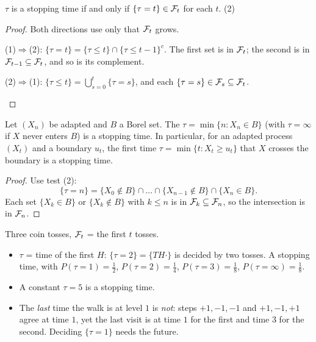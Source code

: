 \begin{result}
\label{res:st-equiv}
$\tau$ is a stopping time if and only if $\{\tau=t\}\in\mathcal F_t$ for each $t$. \hfill (2)
\end{result}
\begin{proof}
Both directions use only that $\mathcal F_t$ grows.
\begin{steps}
  \item (1)$\Rightarrow$(2): $\{\tau=t\}=\{\tau\le t\}\cap\{\tau\le t-1\}^c$. The first set is in $\mathcal F_t$; the second is in $\mathcal F_{t-1}\subseteq\mathcal F_t$, and so is its complement.
  \item (2)$\Rightarrow$(1): $\{\tau\le t\}=\bigcup_{s=0}^t\{\tau=s\}$, and each $\{\tau=s\}\in\mathcal F_s\subseteq\mathcal F_t$. \qedhere
\end{steps}
\end{proof}

\begin{result}
\label{res:entry}
Let $(X_n)$ be adapted and $B$ a Borel set. The  $\tau=\min\{n:X_n\in B\}$ (with $\tau=\infty$ if $X$ never enters $B$) is a stopping time. In particular, for an adapted process $(X_t)$ and a boundary $u_t$, the first time $\tau=\min\{t:X_t\ge u_t\}$ that $X$ crosses the boundary is a stopping time.
\end{result}
\begin{proof}
Use test (2):
\[
  \{\tau=n\}=\{X_0\notin B\}\cap\dots\cap\{X_{n-1}\notin B\}\cap\{X_n\in B\}.
\]
Each set $\{X_k\in B\}$ or $\{X_k\notin B\}$ with $k\le n$ is in $\mathcal F_k\subseteq\mathcal F_n$, so the intersection is in $\mathcal F_n$.
\end{proof}

\begin{example}
Three coin tosses, $\mathcal F_t$ = the first $t$ tosses.
\begin{itemize}
  \item $\tau$ = time of the first $H$: $\{\tau=2\}=\{TH\cdot\}$ is decided by two tosses. A stopping time, with $P(\tau=1)=\frac12$, $P(\tau=2)=\frac14$, $P(\tau=3)=\frac18$, $P(\tau=\infty)=\frac18$.
  \item A constant $\tau=5$ is a stopping time.
  \item The \emph{last} time the walk is at level $1$ is \emph{not}: steps $+1,-1,-1$ and $+1,-1,+1$ agree at time $1$, yet the last visit is at time $1$ for the first and time $3$ for the second. Deciding $\{\tau=1\}$ needs the future.
\end{itemize}
\end{example}

